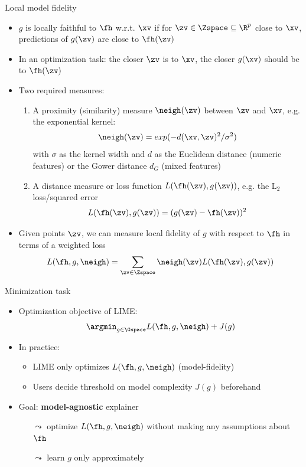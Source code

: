\documentclass[11pt,compress,t,notes=noshow, aspectratio=169, xcolor=table]{beamer}
\begin{document}
\begin{frame}{Local model fidelity}
 	\begin{itemize}
 		\item $g$ is locally faithful to $\fh$ w.r.t. $\xv$ 
 		if for $\zv \in \Zspace \subseteq \R^p$ close to $\xv$, predictions of $g(\zv)$ are close to $\fh(\zv)$ 
 		\item In an optimization task: the closer $\zv$ is to $\xv$, the closer $g(\xv)$ should be to $\fh(\zv)$  
 		\pause
 		\item Two required measures:
 		\begin{enumerate}
 			\item A proximity (similarity) measure $\neigh(\zv)$ between $\zv$ and $\xv$, e.g. the exponential kernel:
 			$$\neigh(\zv) = exp(-d(\xv, \zv)^2/\sigma^2)$$ 
 			with $\sigma$ as the kernel width and $d$ as the Euclidean distance (numeric features) or the Gower distance $d_G$ (mixed features) 
 			\pause
 			\item A distance measure or loss function $L(\fh(\zv), g(\zv))$, e.g. the L$_2$ loss/squared error
 			$$L(\fh(\zv), g(\zv)) = (g(\zv) - \fh(\zv))^2$$ 
 		\end{enumerate}
 		\pause
 		\item Given points $\zv$, we can measure local fidelity of $g$ with respect to $\fh$ in terms of a weighted loss
 		$$ L(\fh, g, \neigh) = \sum_{\zv \in \Zspace} \neigh(\zv) L(\fh(\zv), g(\zv)) $$
 	\end{itemize}
\end{frame}

\begin{frame}[c]{Minimization task}
	\begin{itemize}
		\item Optimization objective of LIME: 
		$$ \argmin_{g \in \Gspace} L(\fh, g, \neigh) + J(g)$$
		\item In practice:
		\begin{itemize}
		    \item LIME only optimizes $L(\fh, g, \neigh)$ (model-fidelity) 	
		    \item Users decide threshold on model complexity $J(g)$ beforehand
		\end{itemize}
		\item Goal: \textbf{model-agnostic} explainer
		\begin{itemize}
    		\item[$\leadsto$] optimize $L(\fh, g, \neigh)$ without making any assumptions about $\fh$ 
    		\item[$\leadsto$] learn $g$ only approximately  
		\end{itemize}
		\end{itemize}
\end{frame} 
\end{document}
